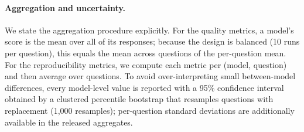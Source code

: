 \documentclass[10pt,letterpaper]{article}
\begin{document}
\paragraph{Aggregation and uncertainty.}
We state the aggregation procedure explicitly. For the quality metrics,
a model's score is the mean over all of its responses; because the
design is balanced (10 runs per question), this equals the mean across
questions of the per-question mean. For the reproducibility metrics, we
compute each metric per (model, question) and then average over
questions. To avoid over-interpreting small between-model differences,
every model-level value is reported with a 95\% confidence interval
obtained by a clustered percentile bootstrap that resamples questions
with replacement (1{,}000 resamples); per-question standard deviations
are additionally available in the released aggregates.
\end{document}
